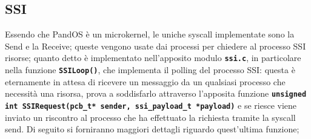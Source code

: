 \documentclass{article}
\begin{document}
	\subsection{SSI}
	Essendo che \textmu PandOS è un microkernel, le uniche syscall implementate sono
	la Send e la Receive; queste vengono usate dai processi per chiedere al
	processo SSI risorse; quanto detto è implementato nell'apposito modulo \texttt{\textbf{ssi.c}},
	in particolare nella funzione \texttt{\textbf{SSILoop()}}, che implementa il polling
	del processo SSI: questa è eternamente in attesa di ricevere un messaggio da
	un qualsiasi processo che necessità una risorsa, prova a soddisfarlo attraverso
	l'apposita funzione \texttt{\textbf{unsigned int SSIRequest(pcb\_t* sender,
	ssi\_payload\_t *payload)}} e se riesce viene inviato un riscontro al processo
	che ha effettuato la richiesta tramite la syscall send. Di seguito si forniranno
	maggiori dettagli riguardo quest'ultima funzione;

	\newpage
\end{document}
